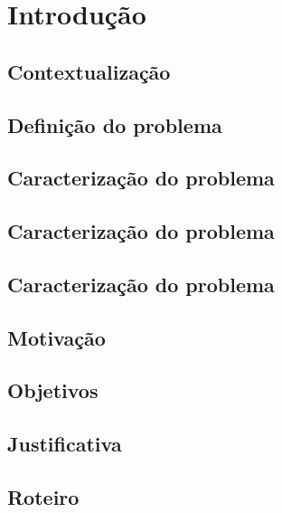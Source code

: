 \section{Introdução}
\subsection{Contextualização}
\subsection{Definição do problema}
\subsection{Caracterização do problema}
\subsection{Caracterização do problema}
\subsection{Caracterização do problema}
\subsection{Motivação}
\subsection{Objetivos}
\subsection{Justificativa}
\subsection{Roteiro}
